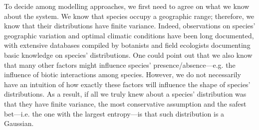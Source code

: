 \documentclass[11pt, a4paper]{article}
\begin{document}
To decide among modelling approaches, we first need to agree on what we know about the system. We know that species occupy a geographic range; therefore, we know that their distributions have finite variance. Indeed, observations on species' geographic variation and optimal climatic conditions have been long documented, with extensive databases compiled by botanists and field ecologists documenting basic knowledge on species' distributions. One could point out that we also know that many other factors might influence species' presence/absence---e.g. the influence of biotic interactions among species. However, we do not necessarily have an intuition of how exactly these factors will influence the shape of species' distributions. As a result, if all we truly knew about a species' distribution was that they have finite variance, the most conservative assumption and the safest bet---i.e. the one with the largest entropy---is that such distribution is a Gaussian.




\end{document}
